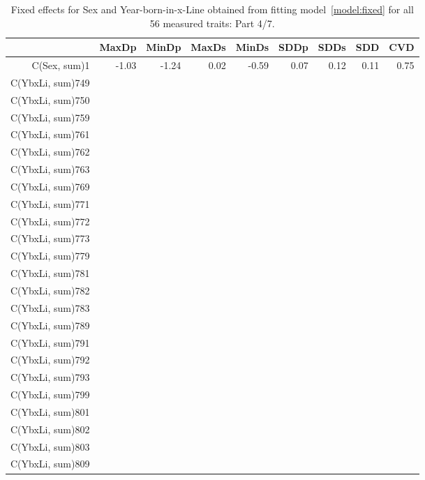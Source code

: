 \begin{table}[p]
\centering
\caption{Fixed effects for Sex and Year-born-in-x-Line obtained from fitting model~\ref{model:fixed} for all 56 measured traits: Part 4/7.}
\label{tab:b4}
\begin{tabular}{rrrrrrrrr}
  \hline
 & MaxDp & MinDp & MaxDs & MinDs & SDDp & SDDs & SDD & CVD \\ 
  \hline
C(Sex, sum)1 & -1.03 & -1.24 & 0.02 & -0.59 & 0.07 & 0.12 & 0.11 & 0.75 \\ 
  C(YbxLi, sum)749 &  &  &  &  &  &  &  &  \\ 
  C(YbxLi, sum)750 &  &  &  &  &  &  &  &  \\ 
  C(YbxLi, sum)759 &  &  &  &  &  &  &  &  \\ 
  C(YbxLi, sum)761 &  &  &  &  &  &  &  &  \\ 
  C(YbxLi, sum)762 &  &  &  &  &  &  &  &  \\ 
  C(YbxLi, sum)763 &  &  &  &  &  &  &  &  \\ 
  C(YbxLi, sum)769 &  &  &  &  &  &  &  &  \\ 
  C(YbxLi, sum)771 &  &  &  &  &  &  &  &  \\ 
  C(YbxLi, sum)772 &  &  &  &  &  &  &  &  \\ 
  C(YbxLi, sum)773 &  &  &  &  &  &  &  &  \\ 
  C(YbxLi, sum)779 &  &  &  &  &  &  &  &  \\ 
  C(YbxLi, sum)781 &  &  &  &  &  &  &  &  \\ 
  C(YbxLi, sum)782 &  &  &  &  &  &  &  &  \\ 
  C(YbxLi, sum)783 &  &  &  &  &  &  &  &  \\ 
  C(YbxLi, sum)789 &  &  &  &  &  &  &  &  \\ 
  C(YbxLi, sum)791 &  &  &  &  &  &  &  &  \\ 
  C(YbxLi, sum)792 &  &  &  &  &  &  &  &  \\ 
  C(YbxLi, sum)793 &  &  &  &  &  &  &  &  \\ 
  C(YbxLi, sum)799 &  &  &  &  &  &  &  &  \\ 
  C(YbxLi, sum)801 &  &  &  &  &  &  &  &  \\ 
  C(YbxLi, sum)802 &  &  &  &  &  &  &  &  \\ 
  C(YbxLi, sum)803 &  &  &  &  &  &  &  &  \\ 
  C(YbxLi, sum)809 &  &  &  &  &  &  &  &  \\ 

\end{tabular}
\end{table}
